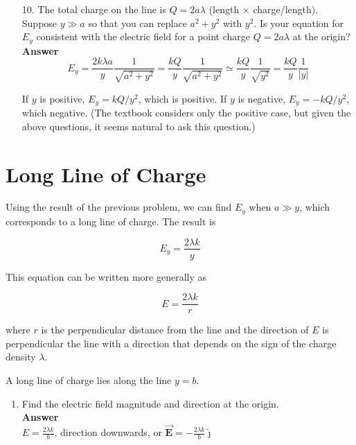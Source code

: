 \documentclass{article}
\newcommand{\ds}[0]{\displaystyle}
\newcommand{\jhat}[0]{\hat{\boldsymbol{\jmath}}}
\newcommand{\bfvec}[1]{\vec{\mathbf{#1}}}
\begin{document}
\begin{enumerate}

  \item[10.] The total charge on the line is $Q=2a\lambda$ (length $\times$ charge/length). Suppose $y\gg a$ so that you can replace $a^2+y^2$ with $y^2$. Is your equation for $E_y$ consistent with the electric field for a point charge $Q=2a\lambda$ at the origin?\\

             \textbf{Answer}\\

             \begin{equation}
               E_y = \frac{2k\lambda a}{y}\frac{1}{\sqrt{a^2+y^2}} =  \frac{kQ}{y}\frac{1}{\sqrt{a^2+y^2}} \simeq  \frac{kQ}{y}\frac{1}{\sqrt{y^2}}=\frac{kQ}{y}\frac{1}{|y|}
             \end{equation}

             If $y$ is positive, $E_y=kQ/y^2$, which is positive. If $y$ is negative, $E_y=-kQ/y^2$, which negative.  (The textbook considers only the positive case, but given the above questions, it seems natural to ask this question.)

\end{enumerate}

%

\section{Long Line of Charge}

Using the result of the previous problem, we can find $E_y$ when $a \gg y$, which corresponds to a long line of charge. The result is

\begin{equation}
  E_y=\frac{2\lambda k}{y}
\end{equation}

This equation can be written more generally as

\begin{equation}
  E=\frac{2\lambda k}{r}
\end{equation}

where $r$ is the perpendicular distance from the line and the direction of $E$ is perpendicular the line with a direction that depends on the sign of the charge density $\lambda$.

A long line of charge lies along the line $y=b$.

\begin{enumerate}

  \item Find the electric field magnitude and direction at the origin.\\

        \textbf{Answer}\\

        $\ds E=\frac{2\lambda k}{b}$, direction downwards, or $\ds \bfvec{E}=-\frac{2\lambda k}{b}\jhat$

\end{enumerate}
\end{document}
